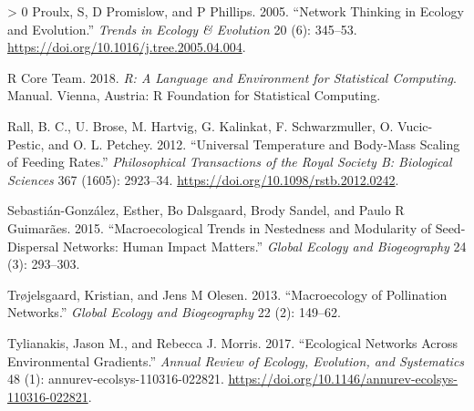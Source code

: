 \documentclass[12pt]{article}
\newlength{\cslhangindent}
\newenvironment{CSLReferences}[3] %
 {%
  \setlength{\parindent}{0pt}
  \ifodd #1 \everypar{\setlength{\hangindent}{\cslhangindent}}\ignorespaces\fi
  \ifnum #2 > 0
  \setlength{\parskip}{#2\baselineskip}
  \fi
 }%
 {}
\begin{document}
\begin{CSLReferences}{1}{0}
\leavevmode\hypertarget{ref-Proulx2005NetThi}{}%
Proulx, S, D Promislow, and P Phillips. 2005. {``Network Thinking in
Ecology and Evolution.''} \emph{Trends in Ecology \& Evolution} 20 (6):
345--53. \url{https://doi.org/10.1016/j.tree.2005.04.004}.

\leavevmode\hypertarget{ref-RCoreTeam2018RLan}{}%
R Core Team. 2018. \emph{R: A Language and Environment for Statistical
Computing}. Manual. Vienna, Austria: R Foundation for Statistical
Computing.

\leavevmode\hypertarget{ref-Rall2012UniTem}{}%
Rall, B. C., U. Brose, M. Hartvig, G. Kalinkat, F. Schwarzmuller, O.
Vucic-Pestic, and O. L. Petchey. 2012. {``Universal Temperature and
Body-Mass Scaling of Feeding Rates.''} \emph{Philosophical Transactions
of the Royal Society B: Biological Sciences} 367 (1605): 2923--34.
\url{https://doi.org/10.1098/rstb.2012.0242}.

\leavevmode\hypertarget{ref-Sebastian-Gonzalez2015MacTre}{}%
Sebastián-González, Esther, Bo Dalsgaard, Brody Sandel, and Paulo R
Guimarães. 2015. {``Macroecological Trends in Nestedness and Modularity
of Seed-Dispersal Networks: Human Impact Matters.''} \emph{Global
Ecology and Biogeography} 24 (3): 293--303.

\leavevmode\hypertarget{ref-Trojelsgaard2013MacPol}{}%
Trøjelsgaard, Kristian, and Jens M Olesen. 2013. {``Macroecology of
Pollination Networks.''} \emph{Global Ecology and Biogeography} 22 (2):
149--62.

\leavevmode\hypertarget{ref-Tylianakis2017EcoNet}{}%
Tylianakis, Jason M., and Rebecca J. Morris. 2017. {``Ecological
Networks Across Environmental Gradients.''} \emph{Annual Review of
Ecology, Evolution, and Systematics} 48 (1):
annurev-ecolsys-110316-022821.
\url{https://doi.org/10.1146/annurev-ecolsys-110316-022821}.

\end{CSLReferences}
\end{document}
